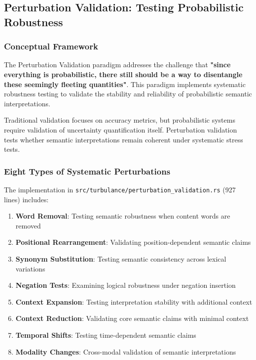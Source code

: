 \documentclass[12pt,a4paper,twoside]{article}
\begin{document}
\begin{itemize}
\subsection{Perturbation Validation: Testing Probabilistic Robustness}

\subsubsection{Conceptual Framework}

The Perturbation Validation paradigm addresses the challenge that \textbf{"since everything is probabilistic, there still should be a way to disentangle these seemingly fleeting quantities"}. This paradigm implements systematic robustness testing to validate the stability and reliability of probabilistic semantic interpretations.

Traditional validation focuses on accuracy metrics, but probabilistic systems require validation of uncertainty quantification itself. Perturbation validation tests whether semantic interpretations remain coherent under systematic stress tests.

\subsubsection{Eight Types of Systematic Perturbations}

The implementation in \texttt{src/turbulance/perturbation\_validation.rs} (927 lines) includes:

\begin{enumerate}
\item \textbf{Word Removal}: Testing semantic robustness when content words are removed
\item \textbf{Positional Rearrangement}: Validating position-dependent semantic claims
\item \textbf{Synonym Substitution}: Testing semantic consistency across lexical variations
\item \textbf{Negation Tests}: Examining logical robustness under negation insertion
\item \textbf{Context Expansion}: Testing interpretation stability with additional context
\item \textbf{Context Reduction}: Validating core semantic claims with minimal context
\item \textbf{Temporal Shifts}: Testing time-dependent semantic claims
\item \textbf{Modality Changes}: Cross-modal validation of semantic interpretations
\end{enumerate}


\end{itemize}
\end{document}
